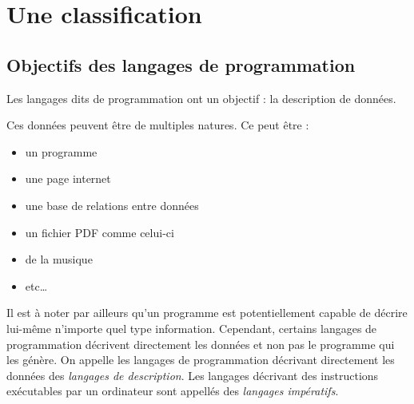 \documentclass[../../main.tex]{subfiles}
\begin{document}
\section{Une classification}
\subsection{Objectifs des langages de programmation}
Les langages dits \og de programmation \fg ont un objectif : la description de données.

Ces données peuvent être de multiples natures. Ce peut être :
\begin{itemize}
	\item un programme
	\item une page internet
	\item une base de relations entre données
	\item un fichier PDF comme celui-ci
	\item de la musique
	\item etc\dots
\end{itemize}
Il est à noter par ailleurs qu'un programme est potentiellement capable de décrire lui-même n'importe quel type information. Cependant, certains langages de programmation décrivent directement les données et non pas le programme qui les génère. On appelle les langages de programmation décrivant directement les données des \textit{langages de description}. Les langages décrivant des instructions exécutables par un ordinateur sont appellés des \textit{langages impératifs}.
\end{document}
